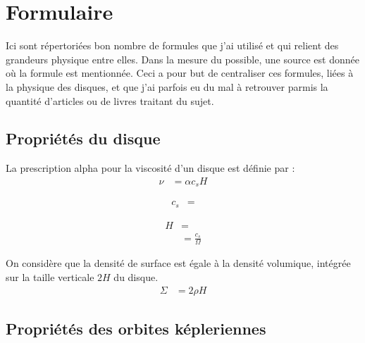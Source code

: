 \chapter{Formulaire}
Ici sont répertoriées bon nombre de formules que j'ai utilisé et qui relient des grandeurs physique entre elles. Dans la mesure du possible, une source est donnée où la formule est mentionnée. Ceci a pour but de centraliser ces formules, liées à la physique des disques, et que j'ai parfois eu du mal à retrouver parmis la quantité d'articles ou de livres traitant du sujet. 

\section{Propriétés du disque}

La prescription alpha pour la viscosité d'un disque est définie par :
\begin{align}
\nu &= \alpha c_s H
\end{align}

\begin{align}
c_s &= 
\end{align}

\begin{align}
H &= \\
&= \frac{c_s}{\Omega}
\end{align}

On considère que la densité de surface est égale à la densité volumique, intégrée sur la taille verticale $2H$ du disque. 
\begin{align}
\Sigma &= 2\rho H
\end{align}

\section{Propriétés des orbites képleriennes}
